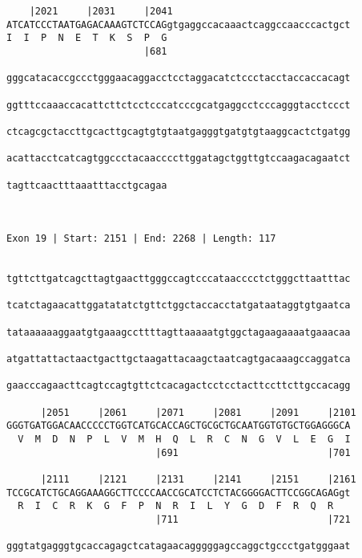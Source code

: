 \documentclass{article}
\begin{document}
\begin{Verbatim}
    |2021     |2031     |2041                               
ATCATCCCTAATGAGACAAAGTCTCCAGgtgaggccacaaactcaggccaacccactgct
I  I  P  N  E  T  K  S  P  G                                
                        |681                                
  
gggcatacaccgccctgggaacaggacctcctaggacatctccctacctaccaccacagt
                                                            
ggtttccaaaccacattcttctcctcccatcccgcatgaggcctcccagggtacctccct
                                                            
ctcagcgctaccttgcacttgcagtgtgtaatgagggtgatgtgtaaggcactctgatgg
                                                            
acattacctcatcagtggccctacaaccccttggatagctggttgtccaagacagaatct
                                                            
tagttcaactttaaatttacctgcagaa
                            
                            
 
Exon 19 | Start: 2151 | End: 2268 | Length: 117


tgttcttgatcagcttagtgaacttgggccagtcccataacccctctgggcttaatttac
                                                            
tcatctagaacattggatatatctgttctggctaccacctatgataataggtgtgaatca
                                                            
tataaaaaaggaatgtgaaagccttttagttaaaaatgtggctagaagaaaatgaaacaa
                                                            
atgattattactaactgacttgctaagattacaagctaatcagtgacaaagccaggatca
                                                            
gaacccagaacttcagtccagtgttctcacagactcctcctacttccttcttgccacagg
                                                            
      |2051     |2061     |2071     |2081     |2091     |2101
GGGTGATGGACAACCCCCTGGTCATGCACCAGCTGCGCTGCAATGGTGTGCTGGAGGGCA
  V  M  D  N  P  L  V  M  H  Q  L  R  C  N  G  V  L  E  G  I
                          |691                          |701
  
      |2111     |2121     |2131     |2141     |2151     |2161
TCCGCATCTGCAGGAAAGGCTTCCCCAACCGCATCCTCTACGGGGACTTCCGGCAGAGgt
  R  I  C  R  K  G  F  P  N  R  I  L  Y  G  D  F  R  Q  R   
                          |711                          |721
  
gggtatgagggtgcaccagagctcatagaacagggggagccaggctgccctgatgggaat


\end{Verbatim}
\end{document}

